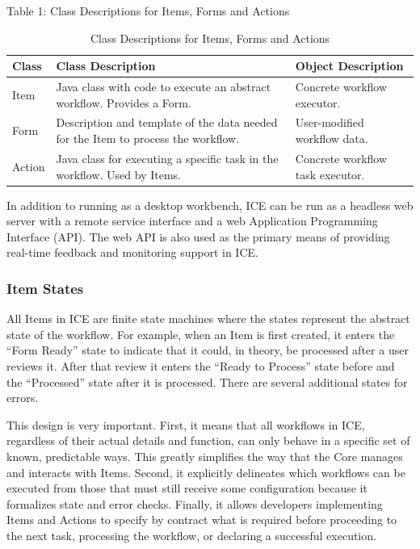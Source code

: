 Table 1: Class Descriptions for Items, Forms and Actions

\begin{table}[t]
\begin{tabularx}{\textwidth}{|l|X|l|}
\hline
Class & Class Description & Object Description\tabularnewline\hline
Item & Java class with code to execute an abstract workflow. Provides a
Form. & Concrete workflow executor.\tabularnewline\hline
Form & Description and template of the data needed for the Item to
process the workflow. & User-modified workflow data.\tabularnewline\hline
Action & Java class for executing a specific task in the workflow. Used
by Items. & Concrete workflow task executor.\tabularnewline\hline
\end{tabularx}
\caption{Class Descriptions for Items, Forms and Actions}
\end{table}

In addition to running as a desktop workbench, ICE can be run as a
headless web server with a remote service interface and a web
Application Programming Interface (API). The web API is also used as the
primary means of providing real-time feedback and monitoring support in
ICE.

\subsubsection{Item States}\label{item-states}

All Items in ICE are finite state machines where the states represent
the abstract state of the workflow. For example, when an Item is first
created, it enters the ``Form Ready'' state to indicate that it could,
in theory, be processed after a user reviews it. After that review it
enters the ``Ready to Process'' state before and the ``Processed'' state
after it is processed. There are several additional states for errors.

This design is very important. First, it means that all workflows in
ICE, regardless of their actual details and function, can only behave in
a specific set of known, predictable ways. This greatly simplifies the
way that the Core manages and interacts with Items. Second, it
explicitly delineates which workflows can be executed from those that
must still receive some configuration because it formalizes state and
error checks. Finally, it allows developers implementing Items and
Actions to specify by contract what is required before proceeding to the
next task, processing the workflow, or declaring a successful execution.

